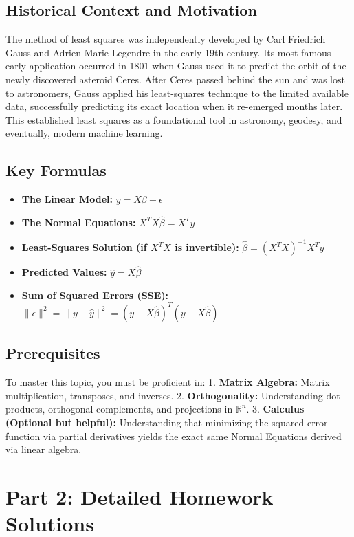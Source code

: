 \documentclass[11pt, letterpaper]{article}
\theoremstyle{definition}
\theoremstyle{remark}
\newcommand{\R}{\mathbb{R}}
\begin{document}
\subsection{Historical Context and Motivation}
The method of least squares was independently developed by Carl Friedrich Gauss and Adrien-Marie Legendre in the early 19th century. Its most famous early application occurred in 1801 when Gauss used it to predict the orbit of the newly discovered asteroid Ceres. After Ceres passed behind the sun and was lost to astronomers, Gauss applied his least-squares technique to the limited available data, successfully predicting its exact location when it re-emerged months later. This established least squares as a foundational tool in astronomy, geodesy, and eventually, modern machine learning.

\subsection{Key Formulas}
\begin{itemize}
    \item \textbf{The Linear Model:} $y = X\beta + \epsilon$
    \item \textbf{The Normal Equations:} $X^T X \hat{\beta} = X^T y$
    \item \textbf{Least-Squares Solution (if $X^T X$ is invertible):} $\hat{\beta} = (X^T X)^{-1} X^T y$
    \item \textbf{Predicted Values:} $\hat{y} = X\hat{\beta}$
    \item \textbf{Sum of Squared Errors (SSE):} $\|\epsilon\|^2 = \|y - \hat{y}\|^2 = (y - X\hat{\beta})^T (y - X\hat{\beta})$
\end{itemize}

\subsection{Prerequisites}
To master this topic, you must be proficient in:
1. \textbf{Matrix Algebra:} Matrix multiplication, transposes, and inverses.
2. \textbf{Orthogonality:} Understanding dot products, orthogonal complements, and projections in $\R^n$.
3. \textbf{Calculus (Optional but helpful):} Understanding that minimizing the squared error function via partial derivatives yields the exact same Normal Equations derived via linear algebra.

\newpage
\section{Part 2: Detailed Homework Solutions}
\end{document}
